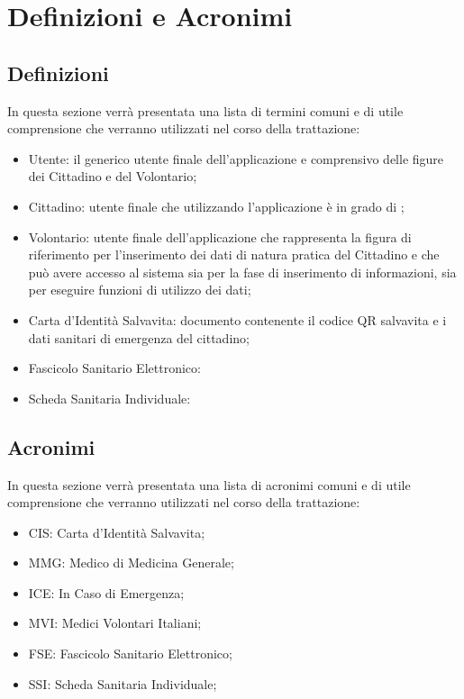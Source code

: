 \documentclass[12pt,a4paper,twoside,openright,titlepage]{book}
\begin{document}



{}




\chapter{Definizioni e Acronimi}
\section{Definizioni}
In questa sezione verrà presentata una lista di termini comuni e di utile comprensione che verranno utilizzati nel corso della trattazione:
\begin{itemize}
\item Utente: il generico utente finale dell'applicazione e comprensivo delle figure dei Cittadino e del Volontario;
\item Cittadino: utente finale che utilizzando l'applicazione è in grado di ;
\item Volontario: utente finale dell'applicazione che rappresenta la figura di riferimento per l'inserimento dei dati di natura pratica del Cittadino e che può avere accesso al sistema sia per la fase di inserimento di informazioni, sia per eseguire funzioni di utilizzo dei dati;
\item Carta d'Identità Salvavita: documento contenente il codice QR salvavita e i dati sanitari di emergenza del cittadino;
\item Fascicolo Sanitario Elettronico:
\item Scheda Sanitaria Individuale:
\end{itemize}

\section{Acronimi}
In questa sezione verrà presentata una lista di acronimi comuni e di utile comprensione che verranno utilizzati nel corso della trattazione:
\begin{itemize}
\item CIS: Carta d'Identità Salvavita;
\item MMG: Medico di Medicina Generale;
\item ICE: In Caso di Emergenza;
\item MVI: Medici Volontari Italiani;
\item FSE: Fascicolo Sanitario Elettronico;
\item SSI: Scheda Sanitaria Individuale;
\end{itemize}
\end{document}
